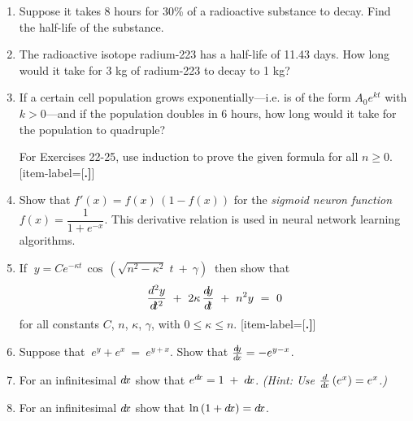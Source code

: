 {\begin{enumerate}[item-label={\bfseries \arabic*.}]
[item-label={{[\bfseries \arabic*.]}}]
 \item Suppose it takes 8 hours for 30\% of a radioactive substance to decay.
  Find the half-life of the substance.
 \item The radioactive isotope radium-223 has a half-life of 11.43 days. How
  long would it take for 3 kg of radium-223 to decay to 1 kg?
 \item If a certain cell population grows exponentially---i.e. is of the form
  $A_0e^{kt}$ with $k>0$---and if the population doubles in 6 hours, how long
 would it take for the population to quadruple?
\par\noindent For Exercises 22-25, use induction to prove the given formula for all $n \ge 0$.
[item-label={{[\bfseries \arabic*.]}}]
\item Show that $f'(x) = f(x)\,(1 - f(x))$ for the
\emph{sigmoid neuron function}
$f(x) = \dfrac{1}{1 + e^{-x}}$. This derivative relation is used in neural network learning
algorithms.
\item If $\;y = C e^{-\kappa t}\,\cos\,\left(\sqrt{n^2 - \kappa^2}\;t ~+~ \gamma\right)~$ then
 show that
 \begin{displaymath}
  \frac{d^2y}{d\!t^2} ~+~ 2\kappa\,\frac{d\negmedspace y}{d\!t} ~+~ n^2 y ~=~ 0
 \end{displaymath}
 for all constants $C$, $n$, $\kappa$, $\gamma$, with $0 \le \kappa \le n$.
[item-label={{[\bfseries \arabic*.]}}]
 \item Suppose that $~e^y + e^x ~=~ e^{y + x}$. Show that $\frac{d\negmedspace y}{d\!x} = -e^{y-x}$.
 \item\label{exer:expdx} For an infinitesimal $d\!x$ show that
  $e^{d\!x} = 1 \;+\; d\!x$. \emph{(Hint: Use $\frac{d}{d\!x}\,(e^x) = e^x$.)}
 \item For an infinitesimal $d\!x$ show that $\ln\,(1 + d\!x) = d\!x$.
\end{enumerate}}
\newpage
